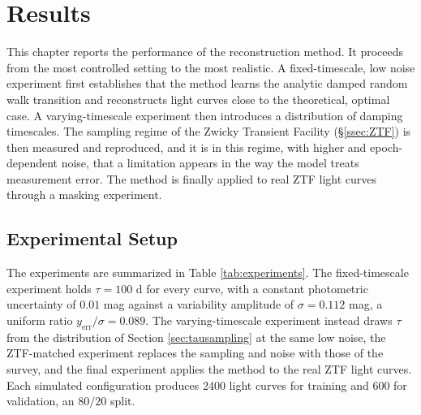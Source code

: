 \chapter{Results}
\label{chap:reconstruction}

This chapter reports the performance of the reconstruction method. It proceeds from the most controlled setting to the most realistic. A fixed-timescale, low noise experiment first establishes that the method learns the analytic damped random walk transition and reconstructs light curves close to the theoretical, optimal case. A varying-timescale experiment then introduces a distribution of damping timescales. The sampling regime of the Zwicky Transient Facility (\S \ref{ssec:ZTF}) is then measured and reproduced, and it is in this regime, with higher and epoch-dependent noise, that a limitation appears in the way the model treats measurement error. The method is finally applied to real ZTF light curves through a masking experiment.

\section{Experimental Setup}
\label{sec:setup}

The experiments are summarized in Table \ref{tab:experiments}. The fixed-timescale experiment holds $\tau = 100$ d for every curve, with a constant photometric uncertainty of $0.01$ mag against a variability amplitude of $\sigma = 0.112$ mag, a uniform ratio $y_{\mathrm{err}}/\sigma = 0.089$. The varying-timescale experiment instead draws $\tau$ from the distribution of Section \ref{sec:tausampling} at the same low noise, the ZTF-matched experiment replaces the sampling and noise with those of the survey, and the final experiment applies the method to the real ZTF light curves. Each simulated configuration produces 2400 light curves for training and 600 for validation, an $80/20$ split.



